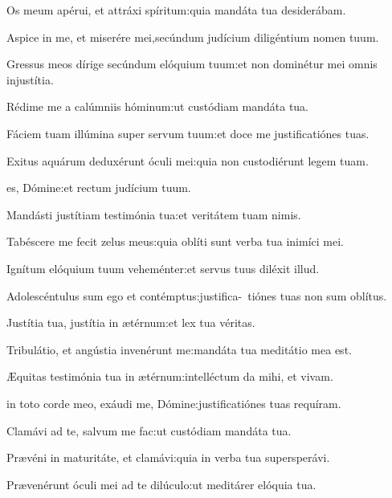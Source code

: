 \begin{multicols}{2}
Os meum apérui, et attráxi spíritum\thinspace:\GreStarNbsp quia mandáta tua desiderábam.

Aspice in me, et miserére mei,\GreStarNbsp secúndum judícium diligéntium nomen tuum.

Gressus meos dírige secúndum elóquium tuum\thinspace:\GreStarNbsp et non dominétur mei omnis injustítia.

Rédime me a calúmniis hóminum\thinspace:\GreStarNbsp ut custódiam mandáta tua.

Fáciem tuam illúmina super servum tuum\thinspace:\GreStarNbsp et doce me justificatiónes tuas.

Exitus aquárum deduxérunt óculi mei\thinspace:\GreStarNbsp quia non custodiérunt legem tuam.



\Normal

 es, Dómine\thinspace:\GreStarNbsp et rectum judícium tuum.

Mandásti justítiam testimónia tua\thinspace:\GreStarNbsp et veritátem tuam nimis.

Tabéscere me fecit zelus meus\thinspace:\GreStarNbsp quia oblíti sunt verba tua inimíci mei.

Ignítum elóquium tuum veheménter\thinspace:\GreStarNbsp et servus tuus diléxit illud.

Adolescéntulus sum ego et contémptus\thinspace:\GreStarNbsp justifica-\ tiónes tuas non sum oblítus.

Justítia tua, justítia in ætérnum\thinspace:\GreStarNbsp et lex tua véritas.

Tribulátio, et angústia invenérunt me\thinspace:\GreStarNbsp mandáta tua meditátio mea est.

Æquitas testimónia tua in ætérnum\thinspace:\GreStarNbsp intelléctum da mihi, et vivam.



\Normal

 in toto corde meo, exáudi me, Dómine\thinspace:\GreStarNbsp justificatiónes tuas requíram.

Clamávi ad te, salvum me fac\thinspace:\GreStarNbsp ut custódiam mandáta tua.

Prævéni in maturitáte, et clamávi\thinspace:\GreStarNbsp quia in verba tua supersperávi.

Prævenérunt óculi mei ad te dilúculo\thinspace:\GreStarNbsp ut meditárer elóquia tua.


\end{multicols}
